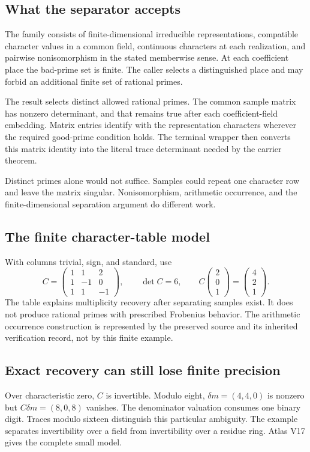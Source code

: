 \subsection{What the separator accepts}
The family consists of finite-dimensional irreducible representations, compatible
character values in a common field, continuous characters at each realization,
and pairwise nonisomorphism in the stated memberwise sense. At each coefficient
place the bad-prime set is finite. The caller selects a distinguished place and
may forbid an additional finite set of rational primes.

The result selects distinct allowed rational primes. The common sample matrix
has nonzero determinant, and that remains true after each coefficient-field
embedding. Matrix entries identify with the representation characters wherever
the required good-prime condition holds. The terminal wrapper then converts this
matrix identity into the literal trace determinant needed by the carrier theorem.

Distinct primes alone would not suffice. Samples could repeat one character row
and leave the matrix singular. Nonisomorphism, arithmetic occurrence, and the
finite-dimensional separation argument do different work.

\subsection{The finite character-table model}
With columns trivial, sign, and standard, use
\[
 C=\begin{pmatrix}1&1&2\\1&-1&0\\1&1&-1\end{pmatrix},
 \qquad \det C=6,
 \qquad C\begin{pmatrix}2\\0\\1\end{pmatrix}
       =\begin{pmatrix}4\\2\\1\end{pmatrix}.
\]
The table explains multiplicity recovery after separating samples exist.
It does not produce rational primes with prescribed Frobenius behavior.
The arithmetic occurrence construction is represented by the preserved source
and its inherited verification record, not by this finite example.

\subsection{Exact recovery can still lose finite precision}
Over characteristic zero, $C$ is invertible. Modulo eight,
$\delta m=(4,4,0)$ is nonzero but $C\delta m=(8,0,8)$ vanishes. The denominator
valuation consumes one binary digit. Traces modulo sixteen distinguish this
particular ambiguity. The example separates invertibility over a field from
invertibility over a residue ring. Atlas V17 gives the complete small model.

